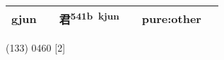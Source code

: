 \documentclass[14pt,a4paper]{scrartcl}
\begin{document}
\begin{longtable}[c]{@{}llllll@{}}
\begin{minipage}[t]{0.14\columnwidth}
gjun
\strut\end{minipage} &
\begin{minipage}[t]{0.14\columnwidth}\raggedright\strut
\strut\end{minipage} &
\begin{minipage}[t]{0.14\columnwidth}\raggedright\strut
君\textsuperscript{541b~kjun}
\strut\end{minipage} &
\begin{minipage}[t]{0.14\columnwidth}\raggedright\strut
\strut\end{minipage} &
\begin{minipage}[t]{0.14\columnwidth}\raggedright\strut
pure:other
\strut\end{minipage}\tabularnewline
\bottomrule
\end{longtable}

(133) 0460 {[}2{]}
\end{document}
